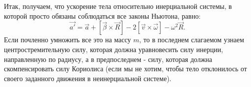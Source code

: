 \documentclass[12pt,epsfig,color,russian]{article}
\begin{document}
Итак, получаем, что ускорение тела относительно инерциальной системы, в которой просто обязаны соблюдаться все законы Ньютона, равно:
   \begin{displaymath}
   \vec{a\prime}=
   \vec{a}+
   \left[\vec{\beta}\times\vec{R}\right]-
   2\left[\vec{v}\times\vec{\omega}\right]-
   \omega^2\vec{R}.
   \end{displaymath}
 Если почленно умножить все это на массу $m$, то в последнем слагаемом узнаем центростремительную силу, которая должна уравновесить силу инерции, направленную по радиусу, а в предпоследнем - силу, которая должна скомпенсировать силу Кориолиса (если мы не хотим, чтобы тело отклонилось от своего заданного движения в неинерциальной системе).
\end{document}
